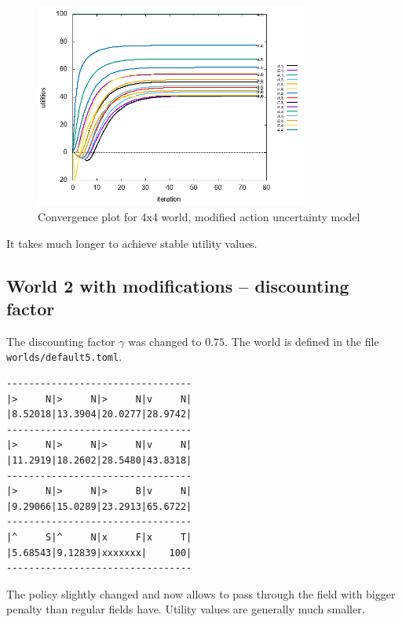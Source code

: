\documentclass[12pt,a4paper]{article} %
\begin{document}
\begin{figure}[H]
\centering
	\includegraphics[width=0.8\textwidth]{../results/default4.png}
	\caption{Convergence plot for 4x4 world, modified action uncertainty model}
	\label{q4}
\end{figure}

It takes much longer to achieve stable utility values.

\subsection{World 2 with modifications -- discounting factor}

The discounting factor $\gamma$ was changed to $0.75$. The world is defined in the file \texttt{worlds/default5.toml}.

\begin{lstlisting}[caption={Results of MDP utility value calculation for 4x4 world, modified discounting factor}]
---------------------------------
|>     N|>     N|>     N|v     N|
|8.52018|13.3904|20.0277|28.9742|
---------------------------------
|>     N|>     N|>     N|v     N|
|11.2919|18.2602|28.5480|43.8318|
---------------------------------
|>     N|>     N|>     B|v     N|
|9.29066|15.0289|23.2913|65.6722|
---------------------------------
|^     S|^     N|x     F|x     T|
|5.68543|9.12839|xxxxxxx|    100|
---------------------------------
\end{lstlisting}

The policy slightly changed and now allows to pass through the field with bigger penalty than regular fields have. Utility values are generally much smaller.
\end{document}
